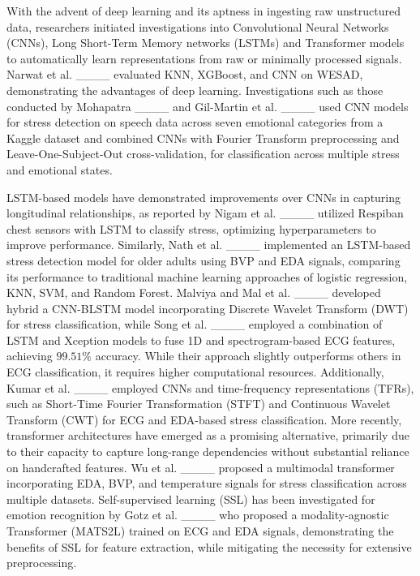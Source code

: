 With the advent of deep learning and its aptness in ingesting raw unstructured data, researchers initiated investigations into Convolutional Neural Networks (CNNs), Long Short-Term Memory networks (LSTMs) and Transformer models to automatically learn representations from raw or minimally processed signals. Narwat et al. ____ evaluated KNN, XGBoost, and CNN on WESAD, demonstrating the advantages of deep learning. Investigations such as those conducted by Mohapatra ____ and Gil-Martin et al. ____ used CNN models for stress detection on speech data across seven emotional categories from a Kaggle dataset and combined CNNs with Fourier Transform preprocessing and Leave-One-Subject-Out cross-validation, for classification across multiple stress and emotional states. 


LSTM-based models have demonstrated improvements over CNNs in capturing longitudinal relationships, as reported by Nigam et al. ____ utilized Respiban chest sensors with LSTM to classify stress, optimizing hyperparameters to improve performance. Similarly, Nath et al. ____ implemented an LSTM-based stress detection model for older adults using BVP and EDA signals, comparing its performance to  traditional machine learning approaches of logistic regression, KNN, SVM, and Random Forest. Malviya and Mal et al. ____ developed hybrid a CNN-BLSTM model incorporating Discrete Wavelet Transform (DWT) for stress classification, while Song et al. ____ employed a combination of LSTM and Xception models to fuse 1D and spectrogram-based ECG features, achieving $99.51\%$ accuracy. While their approach slightly outperforms others in ECG classification, it requires higher computational resources. Additionally, Kumar et al. ____ employed CNNs and time-frequency representations (TFRs), such as Short-Time Fourier Transformation (STFT) and Continuous Wavelet Transform (CWT) for ECG and EDA-based stress classification. More recently, transformer architectures have emerged as a promising alternative, primarily due to their capacity to capture long-range dependencies without substantial reliance on handcrafted features. Wu et al. ____ proposed a multimodal transformer incorporating EDA, BVP, and temperature signals for stress classification across multiple datasets. Self-supervised learning (SSL) has been investigated for emotion recognition by Gotz et al. ____ who proposed a modality-agnostic Transformer (MATS2L) trained on ECG and EDA signals, demonstrating the benefits of SSL for feature extraction, while mitigating the necessity for extensive preprocessing.


